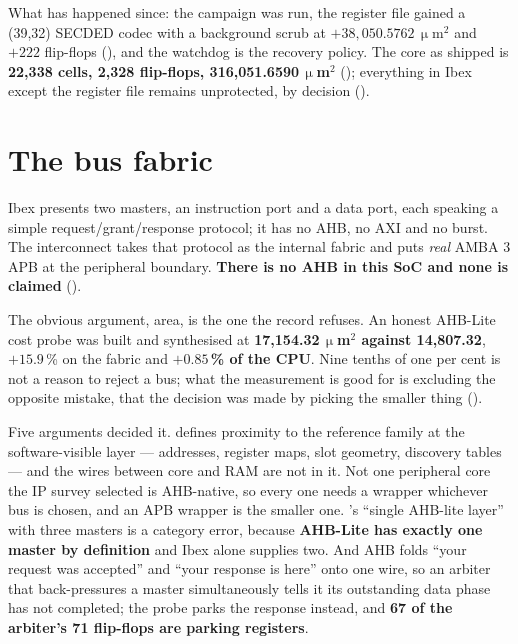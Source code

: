 \begin{sloppypar}
What has happened since: the campaign was run, the register file gained a
(39,32) SECDED codec with a background scrub at
$+38{,}050.5762\,\upmu$m$^2$ and $+222$ flip-flops (), and the
watchdog is the recovery policy. The core as shipped is \textbf{22{,}338 cells, 2{,}328
flip-flops, 316{,}051.6590\,$\upmu$m$^2$} ();
everything in Ibex except the register file remains unprotected, by
decision ().
\end{sloppypar}

\section{The bus fabric}

Ibex presents two masters, an instruction port and a data port, each
speaking a simple request/grant/response protocol; it has no AHB, no AXI
and no burst. The interconnect takes that protocol as the internal fabric
and puts \emph{real} AMBA 3 APB at the peripheral boundary.
\textbf{There is no AHB in this SoC and none is claimed}
().

The obvious argument, area, is the one the record refuses. An honest AHB-Lite cost probe was built and synthesised at \textbf{17{,}154.32\,$\upmu$m$^2$ against
14{,}807.32}, $+15.9$\,\% on the fabric and \textbf{$+0.85$\,\% of the
CPU}. Nine tenths of one per cent is not a reason to reject a bus; what
the measurement is good for is excluding the opposite mistake, that the
decision was made by picking the smaller thing ().

Five arguments decided it.  defines proximity to
the reference family at the software-visible layer --- addresses,
register maps, slot geometry, discovery tables --- and the wires between
core and RAM are not in it. Not one peripheral core the IP survey
selected is AHB-native, so every one needs a wrapper whichever bus is
chosen, and an APB wrapper is the smaller one. 's
``single AHB-lite layer'' with three masters is a category error, because
\textbf{AHB-Lite has exactly one master by definition} and Ibex alone
supplies two. And AHB folds ``your request was accepted'' and ``your
response is here'' onto one wire, so an arbiter that back-pressures a
master simultaneously tells it its outstanding data phase has not
completed; the probe parks the response instead, and \textbf{67 of the
arbiter's 71 flip-flops are parking registers}.

